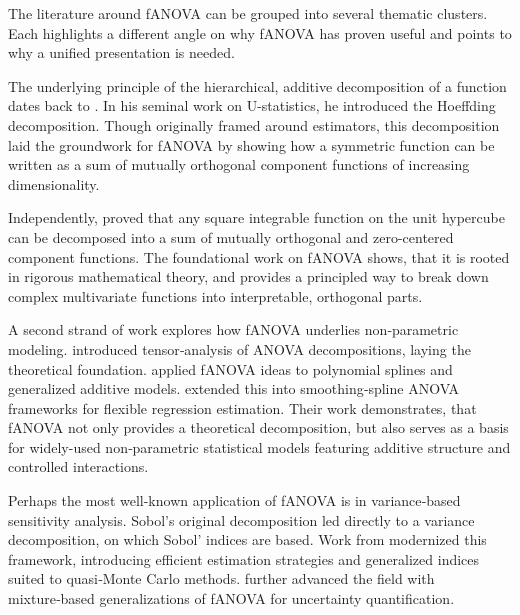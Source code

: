 The literature around fANOVA can be grouped into several thematic clusters. Each highlights a different angle on why fANOVA has proven useful and points to why a unified presentation is needed.\par

The underlying principle of the hierarchical, additive decomposition of a function dates back to \cite{hoeffding1948}. In his seminal work on U-statistics, he introduced the Hoeffding decomposition.
Though originally framed around estimators, this decomposition laid the groundwork for fANOVA by showing how a symmetric function can be written as a sum of mutually orthogonal component functions of increasing dimensionality.\par
Independently, \cite{sobol1993sensitivity} proved that any square integrable function on the unit hypercube can be decomposed into a sum of mutually orthogonal and zero-centered component functions.
The foundational work on fANOVA shows, that it is rooted in rigorous mathematical theory, and provides a principled way to break down complex multivariate functions into interpretable, orthogonal parts.\par

A second strand of work explores how fANOVA underlies non‑parametric modeling.
\citet{takemura1983} introduced tensor‑analysis of ANOVA decompositions, laying the theoretical foundation. \citet{stone1994} applied fANOVA ideas to polynomial splines and generalized additive models. \citet{gu2013} extended this into smoothing‑spline ANOVA frameworks for flexible regression estimation. Their work demonstrates, that fANOVA not only provides a theoretical decomposition, but also serves as a basis for widely-used non‑parametric statistical models featuring additive structure and controlled interactions.\par

Perhaps the most well-known application of fANOVA is in variance‑based sensitivity analysis. Sobol’s original decomposition led directly to a variance decomposition, on which Sobol' indices are based.
Work from \cite{owen2013, owen2014} modernized this framework, introducing efficient estimation strategies and generalized indices suited to quasi‑Monte Carlo methods. \citet{borgonovo2022} further advanced the field with mixture‑based generalizations of fANOVA for uncertainty quantification.\par


